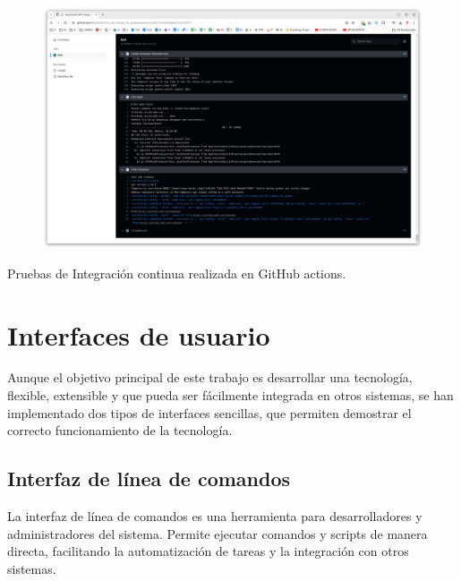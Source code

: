 \begin{figure}
    \centering
    \includegraphics{./chapter/4/images/ad_4nxdvwcz-hxwpamvogmkpwsiwmslmhgbyffk5opiurddtpas2hrsdbgqev6iyg4zlpo67ljzpo0_bovbcxojsomq7dt3vxdvv}
    \caption{}
    \label{fig:ad_4nxdvwcz-hxwpamvogmkpwsiwmslmhgbyffk5opiurddtpas2hrsdbgqev6iyg4zlpo67ljzpo0_bovbcxojsomq7dt3vxdvv}
\end{figure}

Pruebas de Integración continua realizada en GitHub actions.

\section*{Interfaces de usuario}
Aunque el objetivo principal de este trabajo es desarrollar una tecnología, flexible, extensible y que pueda ser fácilmente integrada en otros sistemas, se han implementado dos tipos de interfaces sencillas, que permiten demostrar el correcto funcionamiento de la tecnología.

\subsection*{Interfaz de línea de comandos}
La interfaz de línea de comandos es una herramienta para desarrolladores y administradores del sistema. Permite ejecutar comandos y scripts de manera directa, facilitando la automatización de tareas y la integración con otros sistemas.

